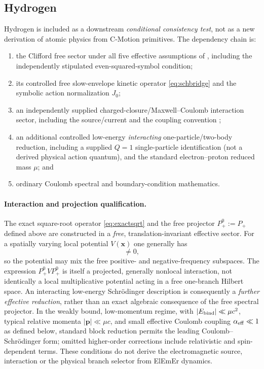 \documentclass[11pt]{article}
\theoremstyle{definition}
\begin{document}
\subsection{Hydrogen}

Hydrogen is included as a downstream \emph{conditional consistency test}, not as a new
derivation of atomic physics from C-Motion primitives.  The dependency chain is:
\begin{enumerate}[leftmargin=*]
\item the Clifford free sector under all five effective assumptions of
  , including the independently stipulated even-squared-symbol condition;
\item its controlled free slow-envelope kinetic operator \eqref{eq:schbridge} and the
  symbolic action normalization $J_0$;
\item an independently supplied charged-closure/Maxwell--Coulomb interaction sector,
  including the source/current and the coupling convention
  \cite{CmotionSMStructureI2026};
\item an additional controlled low-energy \emph{interacting} one-particle/two-body reduction,
  including a supplied $Q=1$ single-particle identification (not a derived physical
  action quantum), and the standard electron--proton reduced mass $\mu$; and
\item ordinary Coulomb spectral and boundary-condition mathematics.
\end{enumerate}

\paragraph{Interaction and projection qualification.}
The exact square-root operator \eqref{eq:exactsqrt} and the free projector
$P_+^0:=P_+$ defined above are constructed in a \emph{free},
translation-invariant effective sector.  For a
spatially varying local potential $V(\mathbf x)$ one generally has
\begin{equation}
 [P_+^0,V(\mathbf x)]\ne 0,
 \label{eq:freeprojpotential}
\end{equation}
so the potential may mix the free positive- and negative-frequency subspaces.
The expression $P_+^0 V P_+^0$ is itself a projected, generally nonlocal interaction,
not identically a local multiplicative potential acting in a free one-branch Hilbert
space.  An interacting low-energy Schr\"odinger description is consequently a
\emph{further effective reduction}, rather than an exact algebraic consequence of the
free spectral projector.  In the weakly bound, low-momentum regime, with
$|E_{\rm bind}|\ll\mu c^2$, typical relative momenta
$|\mathbf p|\ll\mu c$, and small effective Coulomb coupling
$\alpha_{\rm eff}\ll1$ as defined below, standard block reduction permits the leading Coulomb--Schr\"odinger form; omitted
higher-order corrections include relativistic and spin-dependent terms.  These
conditions do not derive the electromagnetic source, interaction or the physical
branch selector from ElEmEr dynamics.
\end{document}
